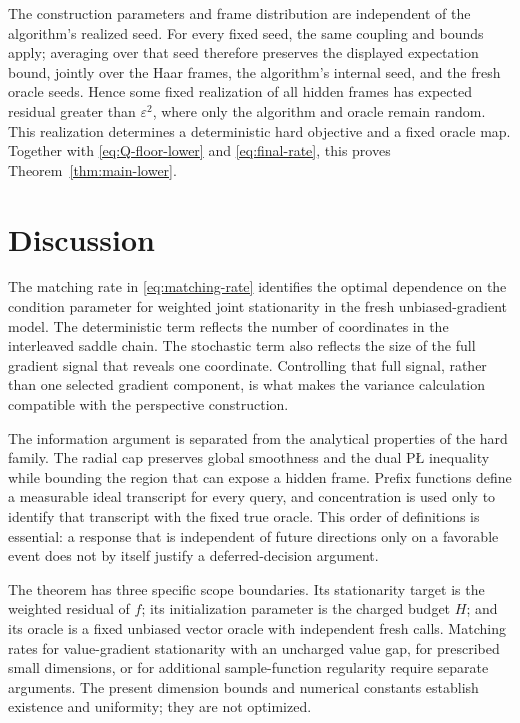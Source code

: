 \documentclass[11pt,a4paper]{article}
\newcommand{\eps}{\varepsilon}
\theoremstyle{definition}
\theoremstyle{remark}
\numberwithin{equation}{section}
\begin{document}
The construction parameters and frame distribution are independent of
the algorithm's realized seed. For every fixed seed, the same coupling
and bounds apply; averaging over that seed therefore preserves the
displayed expectation bound, jointly over the Haar frames, the
algorithm's internal seed, and the fresh oracle seeds. Hence some fixed
realization of all hidden frames has expected residual greater than
$\eps^2$, where only the algorithm and oracle remain random. This
realization determines a deterministic hard objective and a fixed
oracle map. Together with \eqref{eq:Q-floor-lower} and
\eqref{eq:final-rate}, this proves Theorem~\ref{thm:main-lower}.

\section{Discussion}
\label{sec:discussion}

The matching rate in \eqref{eq:matching-rate} identifies the optimal
dependence on the condition parameter for weighted joint stationarity
in the fresh unbiased-gradient model. The deterministic term reflects
the number of coordinates in the interleaved saddle chain. The
stochastic term also reflects the size of the full gradient signal
that reveals one coordinate. Controlling that full signal, rather than
one selected gradient component, is what makes the variance calculation
compatible with the perspective construction.

The information argument is separated from the analytical properties
of the hard family. The radial cap preserves global smoothness and
the dual P\L{} inequality while bounding the region that can expose a
hidden frame. Prefix functions define a measurable ideal transcript
for every query, and concentration is used only to identify that
transcript with the fixed true oracle. This order of definitions is
essential: a response that is independent of future directions only
on a favorable event does not by itself justify a deferred-decision
argument.

The theorem has three specific scope boundaries. Its stationarity
target is the weighted residual of $f$; its initialization parameter
is the charged budget $H$; and its oracle is a fixed unbiased vector
oracle with independent fresh calls. Matching rates for value-gradient
stationarity with an uncharged value gap, for prescribed small
dimensions, or for additional sample-function regularity require
separate arguments. The present dimension bounds and numerical
constants establish existence and uniformity; they are not optimized.
\end{document}
